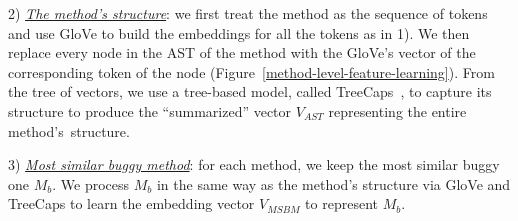 
2) {\em \underline{The method's structure}}: we first treat the
method as the sequence of tokens and use GloVe to build
the embeddings for all the tokens as in 1). We then replace every node
in the AST of the method with the GloVe's vector of the corresponding
token of the node (Figure~\ref{method-level-feature-learning}).  From
the tree of vectors, we use a tree-based model, called
TreeCaps~\cite{bui2021treecaps}, to capture its structure to
produce the ``summarized'' vector $V_{AST}$ representing the entire
method's~structure.


3) {\em \underline{Most similar buggy method}}: for each method, we
keep the most similar buggy one $M_b$. We process $M_b$ in the same
way as the method's structure via GloVe and TreeCaps to learn the
embedding vector $V_{MSBM}$ to represent $M_b$.

